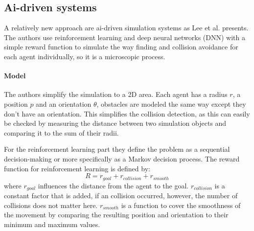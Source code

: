 \documentclass{acmsiggraph}               %
\begin{document}
\subsection{Ai-driven systems}
A relatively new approach are ai-driven simulation systems as Lee et al. \cite{lee_crowd_2018} presents. The authors use reinforcement learning and deep neural networks (DNN) with a simple reward function to simulate the way finding and collision avoidance for each agent individually, so it is a microscopic process.

\paragraph{Model}
The authors simplify the simulation to a 2D area. Each agent has a radius $r$, a position $p$ and an orientation $\theta$, obstacles are modeled the same way except they don't have an orientation. 
This simplifies the collision detection, as this can easily be checked by measuring the distance between two simulation objects and comparing it to the sum of their radii.

For the reinforcement learning part they define the problem as a sequential decision-making or more specifically as a Markov decision process. The reward function for reinforcement learning is defined by: 
\begin{equation}
R = r_{goal} + r_{collision} + r_{smooth}
\end{equation}
where $r_{goal}$ influences the distance from the agent to the goal. $r_{collision}$ is a constant factor that is added, if an collision occurred, however, the number of collisions does not matter here. $r_{smooth}$ is a function to cover the smoothness of the movement by comparing the resulting position and orientation to their minimum and maximum values.  
\end{document}
